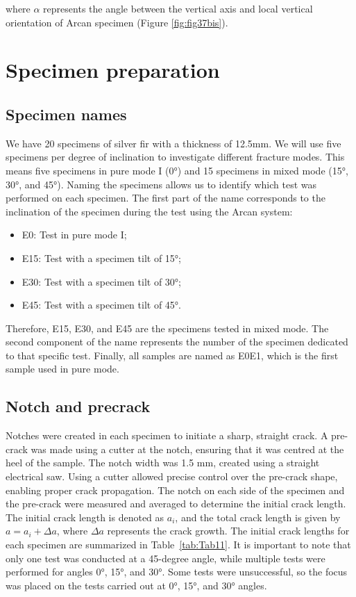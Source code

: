 \noindent where $\alpha$ represents the angle between the vertical axis and local vertical orientation of Arcan specimen (Figure \ref{fig:fig37bis}).

\section{Specimen preparation}

\subsection{Specimen names}

We have 20 specimens of silver fir with a thickness of 12.5mm. We will use five specimens per degree of inclination to investigate different fracture modes. This means five specimens in pure mode I (0°) and 15 specimens in mixed mode (15°, 30°, and 45°).
Naming the specimens allows us to identify which test was performed on each specimen. The first part of the name corresponds to the inclination of the specimen during the test using the Arcan system:

\begin{itemize}
	\item E0: Test in pure mode I;
	\item E15: Test with a specimen tilt of 15°;
	\item E30: Test with a specimen tilt of 30°;
	\item E45: Test with a specimen tilt of 45°.
\end{itemize}

Therefore, E15, E30, and E45 are the specimens tested in mixed mode. The second component of the name represents the number of the specimen dedicated to that specific test. Finally, all samples are named as E0E1, which is the first sample used in pure mode.

\subsection{Notch and precrack}

Notches were created in each specimen to initiate a sharp, straight crack. A pre-crack was made using a cutter at the notch, ensuring that it was centred at the heel of the sample. The notch width was 1.5 mm, created using a straight electrical saw. Using a cutter allowed precise control over the pre-crack shape, enabling proper crack propagation. The notch on each side of the specimen and the pre-crack were measured and averaged to determine the initial crack length. The initial crack length is denoted as $a_i$, and the total crack length is given by $a = a_i + \Delta a$, where $\Delta a$ represents the crack growth.
The initial crack lengths for each specimen are summarized in Table~\ref{tab:Tab11}. It is important to note that only one test was conducted at a 45-degree angle, while multiple tests were performed for angles 0°, 15°, and 30°. Some tests were unsuccessful, so the focus was placed on the tests carried out at 0°, 15°, and 30° angles.

